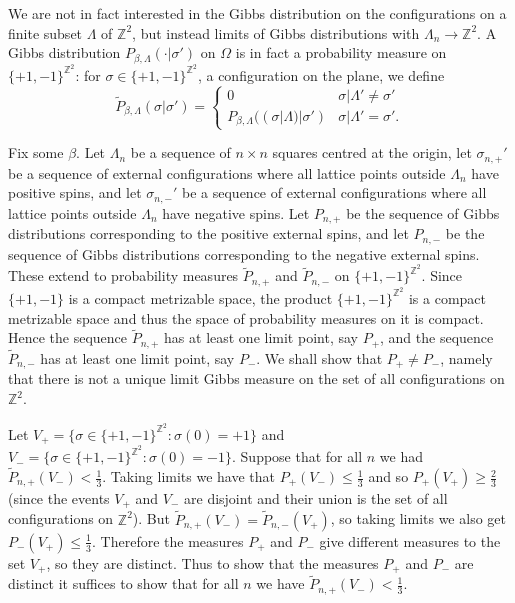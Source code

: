 \documentclass{article}
\begin{document}
We are not in fact interested in the Gibbs distribution on the configurations on a finite subset $\Lambda$ of $\mathbb{Z}^2$, but instead limits of Gibbs distributions with
$\Lambda_n \to \mathbb{Z}^2$. A Gibbs distribution $P_{\beta,\Lambda}(\cdot|\sigma')$ on $\Omega$ is in fact a probability measure on $\{+1,-1\}^{\mathbb{Z}^2}$: for $\sigma \in
\{+1,-1\}^{\mathbb{Z}^2}$, a configuration on the plane, we define
\[
\widetilde{P}_{\beta,\Lambda}(\sigma|\sigma')=\begin{cases}
0&\sigma|\Lambda' \neq \sigma'\\
P_{\beta,\Lambda}((\sigma|\Lambda) |\sigma')&\sigma|\Lambda'=\sigma'.
\end{cases}
\]

Fix some $\beta$.
Let $\Lambda_n$ be a sequence of $n \times n$ squares centred at the origin, let $\sigma_{n,+}'$ be a sequence of external configurations where all lattice points outside $\Lambda_n$
have positive spins, and let $\sigma_{n,-}'$ be a sequence of external configurations where all lattice points outside $\Lambda_n$ have negative spins.
Let $P_{n,+}$ be the sequence of Gibbs distributions corresponding to the positive external spins, and let $P_{n,-}$ be the sequence of Gibbs distributions corresponding to the negative external spins. These extend to probability measures $\widetilde{P}_{n,+}$ and $\widetilde{P}_{n,-}$ on $\{+1,-1\}^{\mathbb{Z}^2}$. Since $\{+1,-1\}$ is a compact metrizable space, the product $\{+1,-1\}^{\mathbb{Z}^2}$ is a compact metrizable space and thus the space of probability measures on it is compact. Hence the sequence $\widetilde{P}_{n,+}$
has at least one limit point, say $P_{+}$, and the sequence $\widetilde{P}_{n,-}$ has at least one limit point, say $P_{-}$. We shall show that $P_+ \neq P_-$, namely that there is not a unique limit Gibbs measure on the set of all configurations on $\mathbb{Z}^2$.


Let $V_+=\{\sigma \in \{+1,-1\}^{\mathbb{Z}^2}: \sigma(0)=+1\}$ and $V_-= \{\sigma \in \{+1,-1\}^{\mathbb{Z}^2}:\sigma(0)=-1\}$. Suppose that for all $n$ we had
$\widetilde{P}_{n,+}(V_-) < \frac{1}{3}$. Taking limits we have that $P_+(V_-) \leq \frac{1}{3}$ and so $P_+(V_+) \geq \frac{2}{3}$ (since the events $V_+$ and $V_-$ are disjoint and their union is the set of all configurations on $\mathbb{Z}^2$). But $\widetilde{P}_{n,+}(V_-)=\widetilde{P}_{n,-}(V_+)$, so taking limits we also get $P_-(V_+) \leq \frac{1}{3}$. Therefore the measures $P_+$ and $P_-$ give different measures to the set $V_+$, so they are distinct. Thus to show that the measures $P_+$ and $P_-$ are distinct it suffices to show that for all $n$ we have $\widetilde{P}_{n,+}(V_-) < \frac{1}{3}$.
\end{document}
